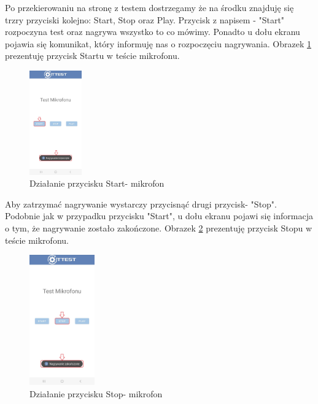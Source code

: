 Po przekierowaniu na stronę z testem dostrzegamy że na środku znajduję się trzry przyciski kolejno: Start, Stop oraz Play. Przycisk z napisem - "Start" rozpoczyna test oraz nagrywa wszystko to co mówimy. Ponadto u dołu ekranu pojawia się komunikat, który informuję nas o rozpoczęciu nagrywania.
\newline
Obrazek \ref{rys:mikrofon} prezentuję przycisk Startu w teście mikrofonu.

\begin{figure}[!hbt]
	\begin{center}
		\includegraphics[angle=360, width=0.2\textwidth]{rys/punkt6/mikrofon}
		\caption{Działanie przycisku Start- mikrofon}
		\label{rys:mikrofon}
	\end{center}
\end{figure}

\newpage


Aby zatrzymać nagrywanie wystarczy przycisnąć drugi przycisk- "Stop". Podobnie jak w przypadku przycisku "Start", u dołu ekranu pojawi się informacja o tym, że nagrywanie zostało zakończone.
\newline 
Obrazek \ref{rys:mikrofon1} prezentuję przycisk Stopu w teście mikrofonu.

\begin{figure}[!hbt]
	\begin{center}
		\includegraphics[angle=360, width=0.25\textwidth]{rys/punkt6/mikrofon1}
		\caption{Działanie przycisku Stop- mikrofon}
		\label{rys:mikrofon1}
	\end{center}
\end{figure}

